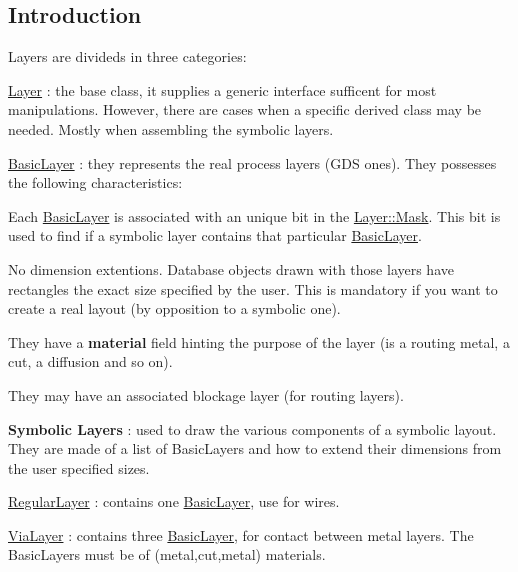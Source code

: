 \hypertarget{classHurricane_1_1Layer_secLayerIntro}{}\subsection{Introduction}\label{classHurricane_1_1Layer_secLayerIntro}
Layers are divideds in three categories\+: 
\begin{DoxyItemize}
\item \mbox{\hyperlink{classHurricane_1_1Layer}{Layer}} \+: the base class, it supplies a generic interface sufficent for most manipulations. However, there are cases when a specific derived class may be needed. Mostly when assembling the symbolic layers. 
\item \mbox{\hyperlink{classHurricane_1_1BasicLayer}{Basic\+Layer}} \+: they represents the real process layers (G\+DS ones). They possesses the following characteristics\+: 
\begin{DoxyItemize}
\item Each \mbox{\hyperlink{classHurricane_1_1BasicLayer}{Basic\+Layer}} is associated with an unique bit in the \mbox{\hyperlink{classHurricane_1_1Layer_af5277c670637bd5d910237e7afe01a91}{Layer\+::\+Mask}}. This bit is used to find if a symbolic layer contains that particular \mbox{\hyperlink{classHurricane_1_1BasicLayer}{Basic\+Layer}}. 
\item No dimension extentions. Database objects drawn with those layers have rectangles the exact size specified by the user. This is mandatory if you want to create a real layout (by opposition to a symbolic one). 
\item They have a {\bfseries material} field hinting the purpose of the layer (is a routing metal, a cut, a diffusion and so on). 
\item They may have an associated blockage layer (for routing layers). 
\end{DoxyItemize}
\item {\bfseries Symbolic Layers} \+: used to draw the various components of a symbolic layout. They are made of a list of Basic\+Layers and how to extend their dimensions from the user specified sizes. 
\begin{DoxyItemize}
\item \mbox{\hyperlink{classHurricane_1_1RegularLayer}{Regular\+Layer}} \+: contains one \mbox{\hyperlink{classHurricane_1_1BasicLayer}{Basic\+Layer}}, use for wires. 
\item \mbox{\hyperlink{classHurricane_1_1ViaLayer}{Via\+Layer}} \+: contains three \mbox{\hyperlink{classHurricane_1_1BasicLayer}{Basic\+Layer}}, for contact between metal layers. The Basic\+Layers must be of {\ttfamily }(metal,cut,metal) materials. 

\end{DoxyItemize}
\end{DoxyItemize}
